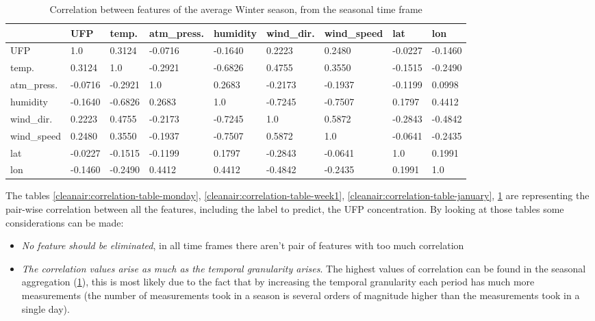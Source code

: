 \documentclass[11pt,a4paper,titlepage]{book}
\begin{document}
\begin{table}[ht]
    \small
    \begin{tabular}{@{}lllllllll@{}}
    \toprule
                & UFP     & temp.   & atm\_press. & humidity & wind\_dir. & wind\_speed & lat     & lon     \\ \midrule
    UFP         & 1.0     & 0.3124  & -0.0716     & -0.1640  & 0.2223     & 0.2480      & -0.0227 & -0.1460 \\
    temp.       & 0.3124  & 1.0     & -0.2921     & -0.6826  & 0.4755     & 0.3550      & -0.1515 & -0.2490 \\
    atm\_press. & -0.0716 & -0.2921 & 1.0         & 0.2683   & -0.2173    & -0.1937     & -0.1199 & 0.0998  \\
    humidity    & -0.1640 & -0.6826 & 0.2683      & 1.0      & -0.7245    & -0.7507     & 0.1797  & 0.4412  \\
    wind\_dir.  & 0.2223  & 0.4755  & -0.2173     & -0.7245  & 1.0        & 0.5872      & -0.2843 & -0.4842 \\
    wind\_speed & 0.2480  & 0.3550  & -0.1937     & -0.7507  & 0.5872     & 1.0         & -0.0641 & -0.2435 \\
    lat         & -0.0227 & -0.1515 & -0.1199     & 0.1797   & -0.2843    & -0.0641     & 1.0     & 0.1991  \\
    lon         & -0.1460 & -0.2490 & 0.4412      & 0.4412   & -0.4842    & -0.2435     & 0.1991  & 1.0     \\ \bottomrule
    \end{tabular}
    \caption{Correlation between features of the average Winter season, from the seasonal time frame}
    \label{cleanair:correlation-table-winter}
\end{table}
The tables \ref{cleanair:correlation-table-monday}, \ref{cleanair:correlation-table-week1}, \ref{cleanair:correlation-table-january}, \ref{cleanair:correlation-table-winter} are representing the pair-wise correlation between all the features, including the label to predict, the UFP concentration. By looking at those tables some considerations can be made:
\begin{itemize}
    \item \textit{No feature should be eliminated}, in all time frames there aren't pair of features with too much correlation
    \item \textit{The correlation values arise as much as the temporal granularity arises}. The highest values of correlation can be found in the seasonal aggregation (\ref{cleanair:correlation-table-winter}), this is most likely due to the fact that by increasing the temporal granularity each period has much more measurements (the number of measurements took in a season is several orders of magnitude higher than the measurements took in a single day).
\end{itemize}
\end{document}
